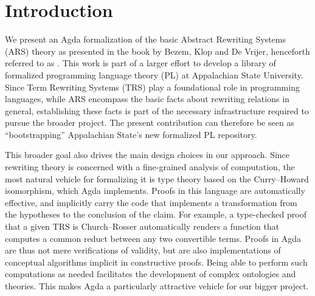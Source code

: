 \section{Introduction}

\newcommand{\inreview}[1]{#1}

\label{sec:Introduction}

%


We present an Agda formalization of the basic Abstract Rewriting Systems (ARS) theory as presented in the book by Bezem, Klop and De Vrijer,
henceforth referred to as \terese. %
This work is part of a larger effort to develop a library of formalized programming language theory (PL)
at \inreview{Appalachian State} University.
Since Term Rewriting Systems (TRS) play a foundational role in programming languages,
while ARS encompass the basic facts about rewriting relations in general,
establishing these facts is part of the necessary infrastructure required to
pursue the broader project.  The present contribution can therefore be seen as
``bootstrapping'' \inreview{Appalachian State}'s new formalized PL repository.
\cite{FPLA}

This broader goal also drives the main design choices in our approach.
Since rewriting theory is concerned with a fine-grained analysis of computation,
the most natural vehicle for formalizing it is type theory based on the
Curry--Howard isomorphism, which Agda implements.  Proofs in this language
are automatically effective, and implicitly carry the code that implements
a transformation from the hypotheses to the conclusion of the claim.  For example,
a type-checked proof that a given TRS is Church--Rosser automatically renders a function that
computes a common reduct between any two convertible terms.
Proofs in Agda are thus not mere verifications of validity, but are also implementations
of conceptual algorithms implicit in constructive proofs.
Being able to perform such computations as needed
facilitates the development of complex ontologies and theories.
This makes Agda a particularly attractive vehicle for our bigger project.

